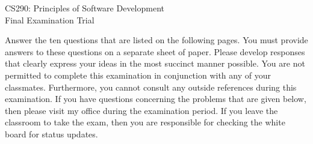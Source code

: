 \documentclass[12pt,epsf,psfig,graphics]{article}
\def\widow#1{\vskip #1\vbadness10000\penalty-200\vskip-#1}
\begin{document}
\def\widow#1{\vskip #1\vbadness10000\penalty-200\vskip-#1}

\begin{center}

CS290: Principles of Software Development \\
Final Examination Trial \\

\end{center}

\noindent
Answer the ten questions that are listed on the following pages.  You
must provide answers to these questions on a separate sheet of paper.
Please develop responses that clearly express your ideas in the most
succinct manner possible.  You are not permitted to complete this
examination in conjunction with any of your classmates.  Furthermore,
you cannot consult any outside references during this examination.  If
you have questions concerning the problems that are given below, then
please visit my office during the examination period.  If you leave
the classroom to take the exam, then you are responsible for checking
the white board for status updates.

\end{document}
